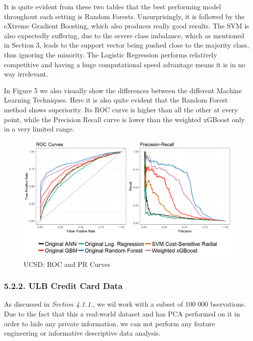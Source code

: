 \documentclass[12pt,]{article}
\begin{document}
It is quite evident from these two tables that the best performing model
throughout each setting is Random Forests. Unsurprisingly, it is
followed by the eXtreme Gradient Boosting, which also produces really
good results. The SVM is also expectedly suffering, due to the severe
class imbalance, which as mentioned in Section 3, leads to the support
vector being pushed close to the majority class, thus ignoring the
minority. The Logistic Regression performs relatively competitive and
having a huge computational speed advantage means it is in no way
irrelevant.

In Figure 5 we also visually show the differences between the different
Machine Learning Techniques. Here it is also quite evident that the
Random Forest method shows superiority. Its ROC curve is higher than all
the other at every point, while the Precision Recall curve is lower than
the weighted xGBoost only in a very limited range.

\begin{figure}
\centering
\includegraphics[width=1\textwidth,height=\textheight]{figures/ucsd/ucsd_pr_roc.png}
\caption{UCSD: ROC and PR Curves}
\end{figure}

\hypertarget{ulb-credit-card-data}{%
\subsubsection{5.2.2. ULB Credit Card Data}\label{ulb-credit-card-data}}

As discussed in \emph{Section 4.1.1.}, we wil work with a subset of 100
000 bservations. Due to the fact that this a real-world dataset and has
PCA performed on it in order to hide any private information, we can not
perform any feature engineering or informative descriptive data
analysis.
\end{document}

